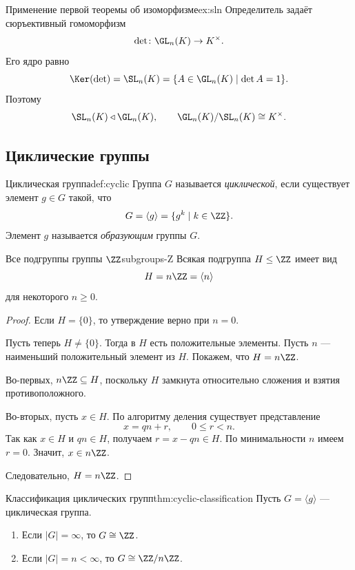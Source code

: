 \begin{Example}{Применение первой теоремы об изоморфизме}{ex:sln}
	Определитель задаёт сюръективный гомоморфизм
	\[
	\det\colon \GL_n(K)\to K^{\times}.
	\]
	Его ядро равно
	\[
	\Ker(\det)=\SL_n(K)=\{A\in \GL_n(K)\mid \det A=1\}.
	\]
	Поэтому
	\[
	\SL_n(K)\triangleleft \GL_n(K),
	\qquad
	\GL_n(K)/\SL_n(K)\cong K^{\times}.
	\]
\end{Example}

\subsection{Циклические группы}

\begin{Definition}{Циклическая группа}{def:cyclic}
	Группа $G$ называется \emph{циклической}, если существует элемент $g\in G$ такой, что
	\[
	G=\langle g\rangle = \{g^k\mid k\in \ZZ\}.
	\]
	Элемент $g$ называется \emph{образующим} группы $G$.
\end{Definition}

\begin{Theorem}{Все подгруппы группы $\ZZ$}{subgroups-Z}
	Всякая подгруппа $H\le \ZZ$ имеет вид
	\[
	H=n\ZZ=\langle n\rangle
	\]
	для некоторого $n\ge 0$.
\end{Theorem}

\begin{proof}
	Если $H=\{0\}$, то утверждение верно при $n=0$.
	
	Пусть теперь $H\ne\{0\}$. Тогда в $H$ есть положительные элементы. Пусть $n$ --- наименьший положительный элемент из $H$. Покажем, что $H=n\ZZ$.
	
	Во-первых, $n\ZZ\subseteq H$, поскольку $H$ замкнута относительно сложения и взятия противоположного.
	
	Во-вторых, пусть $x\in H$. По алгоритму деления существует представление
	\[
	x=qn+r, \qquad 0\le r<n.
	\]
	Так как $x\in H$ и $qn\in H$, получаем $r=x-qn\in H.$
	По минимальности $n$ имеем $r=0$. Значит, $x\in n\ZZ$.
	
	Следовательно, $H=n\ZZ$.
\end{proof}

\begin{Theorem}{Классификация циклических групп}{thm:cyclic-classification}
	Пусть $G=\langle g\rangle$ --- циклическая группа.
	\begin{enumerate}
		\item Если $|G|=\infty$, то $G\cong \ZZ$.
		\item Если $|G|=n<\infty$, то $G\cong \ZZ/n\ZZ$.
	\end{enumerate}
\end{Theorem}

